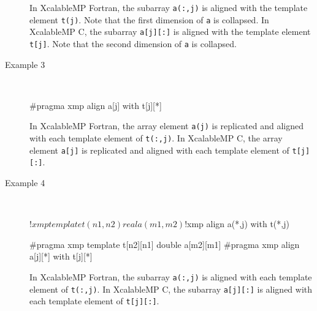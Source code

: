 \begin{description}
In XcalableMP Fortran,
the subarray {\tt a(:,j)} is aligned with the template element {\tt t(j)}. 
Note that the first dimension of {\tt a} is collapsed.
In XcalableMP C,
the subarray {\tt a[j][:]} is aligned with the template element {\tt t[j]}.
Note that the second dimension of {\tt a} is collapsed.

\item[Example 3]~\\[0.5cm]
\begin{minipage}{0.43\hsize}
\begin{center}
\end{center}
\end{minipage}
%
\begin{minipage}{0.5\hsize}
\begin{center}
\begin{XCexampleR}
#pragma xmp align a[j] with t[j][*]
\end{XCexampleR}
\end{center}
\end{minipage}

In XcalableMP Fortran, 
the array element {\tt a(j)} is replicated and aligned with each
template element of {\tt t(:,j)}.
In XcalableMP C,
the array element {\tt a[j]} is replicated and aligned with each
template element of {\tt t[j][:]}.

\item[Example 4]~\\[0.5cm]
\begin{minipage}{0.43\hsize}
\begin{center}
\begin{XFexample}
!$xmp template t(n1,n2)
real a(m1,m2)
!$xmp align a(*,j) with t(*,j)
\end{XFexample}
\end{center}
\end{minipage}
%
\begin{minipage}{0.5\hsize}
\begin{center}
\begin{XCexampleR}
#pragma xmp template t[n2][n1]
double a[m2][m1]
#pragma xmp align a[j][*] with t[j][*]
\end{XCexampleR}
\end{center}
\end{minipage}

In XcalableMP Fortran, 
the subarray {\tt a(:,j)} is aligned with each template element of {\tt t(:,j)}.
In XcalableMP C,
the subarray {\tt a[j][:]} is aligned with each template element of {\tt t[j][:]}.


\end{description}
